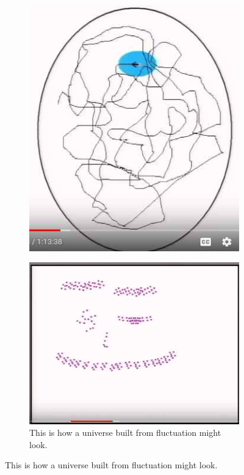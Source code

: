 \documentclass[]{article}
\begin{document}
\begin{figure}[H]
\begin{subfigure}[b]{0.3\textwidth}
		\includegraphics[width=\textwidth]{time-univers-passes-through-every-possible-state}
	\end{subfigure}
	\;
	\begin{subfigure}[b]{0.3\textwidth}
		\caption{This is how a universe built from fluctuation might look.}\label{fig:time-universe-from-fluctuation}
		\includegraphics[width=\textwidth]{time-universe-from-fluctuation}
	\end{subfigure}
\end{figure}
\end{document}
